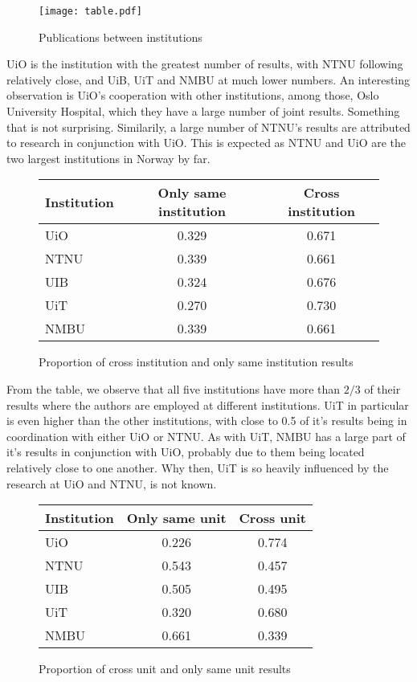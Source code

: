 \begin{figure}[h]
  \centering
  \texttt{[image: table.pdf]}
  \caption{Publications between institutions}
  \label{fig:result}
\end{figure}

UiO is the institution with the greatest number of results, with NTNU following relatively close, and UiB, UiT and NMBU at much lower numbers.
An interesting observation is UiO’s cooperation with other institutions, among those, Oslo University Hospital, which they have a large number of joint results. Something that is not surprising.
Similarily, a large number of NTNU’s results are attributed to research in conjunction with UiO. This is expected as NTNU and UiO are the two largest institutions in Norway by far.

\begin{figure}[h]
	\centering
	\begin{tabular}{| l || c | c |}
		\hline
		Institution	& Only same institution	& Cross institution	\\ \hline
		UiO		& 0.329			& 0.671			\\
		NTNU		& 0.339			& 0.661			\\
		UIB		& 0.324			& 0.676			\\
		UiT		& 0.270			& 0.730			\\
		NMBU		& 0.339			& 0.661			\\
		\hline
	\end{tabular}
	\caption{Proportion of cross institution and only same institution results}
	\label{tab:institution-proportion}
\end{figure}

From the table, we observe that all five institutions have more than $2/3$ of their results where the authors are employed at different institutions. UiT in particular is even higher than the other institutions, with close to 0.5 of it’s results being in coordination with either UiO or NTNU. As with UiT, NMBU has a large part of it’s results in conjunction with UiO, probably due to them being located relatively close to one another. Why then, UiT is so heavily influenced by the research at UiO and NTNU, is not known.

\begin{figure}[h]
	\centering
	\begin{tabular}{| l || c | c |}
		\hline
		Institution	& Only same unit	& Cross unit	\\ \hline
		UiO		& 0.226			& 0.774		\\
		NTNU		& 0.543			& 0.457		\\
		UIB		& 0.505			& 0.495		\\
		UiT		& 0.320			& 0.680		\\
		NMBU		& 0.661			& 0.339		\\
		\hline
	\end{tabular}
	\caption{Proportion of cross unit and only same unit results}
	\label{tab:unit-proportion}
\end{figure}

